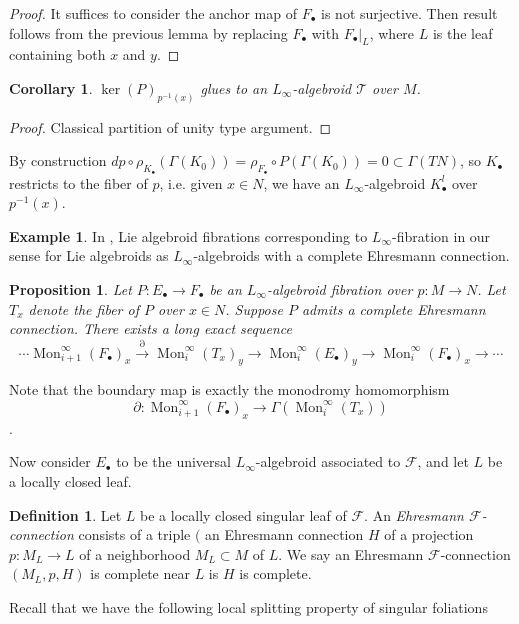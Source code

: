 \documentclass[12pt]{amsart}
\newtheorem{cor}[thm]{Corollary}
\newtheorem{prop}[thm]{Proposition}
\theoremstyle{definition}
\newtheorem{example}[thm]{Example}
\newtheorem{defn}[thm]{Definition}
\theoremstyle{remark}
\numberwithin{equation}{section}
\newcommand{\del}{\partial}
\renewcommand{\del}{\partial}
\newcommand{\CF}{{\mathcal F}}
\newcommand{\1}{{\mathbb{1}}}
\newcommand{\bt}{\bullet}
\newcommand{\mon}{\operatorname{Mon}}
\begin{document}
\begin{proof}
    It suffices to consider the anchor map of $F_{\bt}$ is not surjective. Then result follows from the previous lemma by replacing $F_{\bullet}$ with $F_{\bt}|_L$, where $L$ is the leaf containing both $x$ and $y$.
\end{proof}

\begin{cor}
    $\ker(P)_{p^{-1}(x)}$ glues to an $L_{\infty}$-algebroid $\mathcal{T}$ over $M$.
\end{cor}
\begin{proof}
    Classical partition of unity type argument.
\end{proof}

By construction $dp \circ\rho_{K_{\bullet}}(\Gamma(K_0)) =\rho_{F_{\bullet}} \circ P(\Gamma(K_0)) = 0 \subset \Gamma(TN)$, so $K_{\bullet}$ restricts to the fiber of $p$, i.e. given $x\in N$, we have an $L_{\infty}$-algebroid $K_{\bullet}^l$ over $p^{-1}(x)$.

\begin{example}
    In \cite{BZ11}, Lie algebroid fibrations corresponding to $L_{\infty}$-fibration in our sense for Lie algebroids as $L_{\infty}$-algebroids with a complete Ehresmann connection.
\end{example}
\begin{prop}
Let $P: E_{\bullet} \to F_{\bullet}$ be an $L_{\infty}$-algebroid fibration over $p:M \to N$. Let $T_x$ denote the fiber of $P$ over $x\in N$. Suppose $P$ admits a complete Ehresmann connection. There exists a long exact sequence
\begin{equation}
    \cdots \mon^{\infty}_{i+1}(F_{\bullet})_x \stackrel{\del}{\to} \mon^{\infty}_i(T_x)_y \to \mon^{\infty}_i(E_{\bullet})_y\to \mon^{\infty}_i(F_{\bullet})_x \to \cdots
\end{equation}
\end{prop}

Note that the boundary map is exactly the monodromy homomorphism $$\del: \mon^{\infty}_{i+1}(F_{\bullet})_x \stackrel{}{\to} \Gamma(\mon^{\infty}_i(T_x))$$. 


Now consider $E_{\bullet}$ to be the universal $L_{\infty}$-algebroid associated to $\CF$, and let $L$ be a locally closed leaf.

\begin{defn}
    Let $L$ be a locally closed singular leaf of $\CF$. An {\it Ehresmann $\CF$-connection} consists of a triple $($ an Ehresmann connection $H$ of a projection $p:M_L \to L$ of a neighborhood $M_L \subset M$ of $L$. We say an Ehresmann $\CF$-connection $(M_L, p, H)$ is complete near $L$ is $H$ is complete. 
    
    
\end{defn}
Recall that we have the following local splitting property of singular foliations
\end{document}
